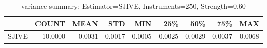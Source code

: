 \begin{table}[ht]
\centering
\caption{variance summary: Estimator=SJIVE, Instruments=250, Strength=0.60}
\begin{tabular}{lrrrrrrrr}
\toprule
 & COUNT & MEAN & STD & MIN & 25\% & 50\% & 75\% & MAX \\
\midrule
SJIVE & 10.0000 & 0.0031 & 0.0017 & 0.0005 & 0.0025 & 0.0029 & 0.0037 & 0.0068 \\
\bottomrule
\end{tabular}
\end{table}
